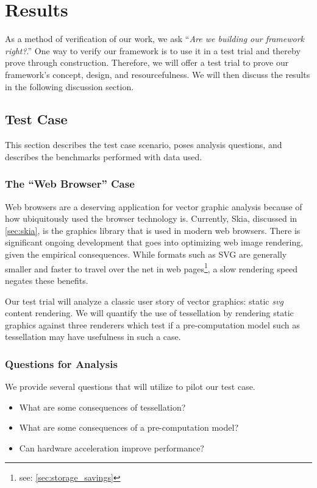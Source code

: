 \chapter{Results}\label{sec:results}
As a method of verification of our work, we ask ``\textit{Are we building our framework right?}.'' One way to verify our framework is to use it in a test trial and thereby prove through construction. Therefore, we will offer a test trial to prove our framework's concept, design, and resourcefulness. We will then discuss the results in the following discussion section.

\section{Test Case}\label{sec:test_case}
This section describes the test case scenario, poses analysis questions, and describes the benchmarks performed with data used.

\subsection{The ``Web Browser'' Case}\label{sec:web_browser_case}
Web browsers are a deserving application for vector graphic analysis because of how ubiquitously used the browser technology is. Currently, Skia, discussed in \cref{sec:skia}, is the graphics library that is used in modern web browsers. There is significant ongoing development that goes into optimizing web image rendering, given the empirical consequences. While formats such as SVG are generally smaller and faster to travel over the net in web pages\footnote{see: \cref{sec:storage_savings}}, a slow rendering speed negates these benefits.\medskip

Our test trial will analyze a classic user story of vector graphics: static \textit{svg} content rendering. We will quantify the use of tessellation by rendering static graphics against three renderers which test if a pre-computation model such as tessellation may have usefulness in such a case.

\subsection{Questions for Analysis}
We provide several questions that \toolname will utilize to pilot our test case.
\begin{itemize}
    \item What are some consequences of tessellation?
    \item What are some consequences of a pre-computation model?
    \item Can hardware acceleration improve performance?
\end{itemize}

